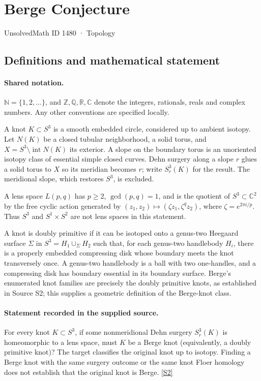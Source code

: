 \documentclass[11pt]{article}
\newcommand{\sref}[2]{\hyperlink{source:#1:#2}{[S#2]}}
\begin{document}
\setcounter{section}{1479}
\section{Berge Conjecture}\label{1480}
{\small\sffamily UnsolvedMath ID 1480 · Topology}
\subsection{Definitions and mathematical statement}

\paragraph{Shared notation.}$\mathbb N=\{1,2,\ldots\}$, and $\mathbb Z,\mathbb Q,\mathbb R,\mathbb C$ denote the integers, rationals, reals and complex numbers. Any other conventions are specified locally.


A knot $K\subset S^3$ is a smooth embedded circle, considered up to ambient isotopy. Let $N(K)$ be a closed tubular neighborhood, a solid torus, and $X=S^3\setminus\operatorname{int}N(K)$ its exterior. A slope on the boundary torus is an unoriented isotopy class of essential simple closed curves. Dehn surgery along a slope $r$ glues a solid torus to $X$ so its meridian becomes $r$; write $S^3_r(K)$ for the result. The meridional slope, which restores $S^3$, is excluded.

A lens space $L(p,q)$ has $p\ge2$, $\gcd(p,q)=1$, and is the quotient of $S^3\subset\mathbb C^2$ by the free cyclic action generated by $(z_1,z_2)\mapsto(\zeta z_1,\zeta^q z_2)$, where $\zeta=e^{2\pi i/p}$. Thus $S^3$ and $S^1\times S^2$ are not lens spaces in this statement.

A knot is doubly primitive if it can be isotoped onto a genus-two Heegaard surface $\Sigma$ in $S^3=H_1\cup_\Sigma H_2$ such that, for each genus-two handlebody $H_i$, there is a properly embedded compressing disk whose boundary meets the knot transversely once. A genus-two handlebody is a ball with two one-handles, and a compressing disk has boundary essential in its boundary surface. Berge's enumerated knot families are precisely the doubly primitive knots, as established in Source S2; this supplies a geometric definition of the Berge-knot class.
\paragraph{Statement recorded in the supplied source.}
For every knot $K\subset S^3$, if some nonmeridional Dehn surgery $S^3_r(K)$ is homeomorphic to a lens space, must $K$ be a Berge knot (equivalently, a doubly primitive knot)? The target classifies the original knot up to isotopy. Finding a Berge knot with the same surgery outcome or the same knot Floer homology does not establish that the original knot is Berge. \sref{1480}{2}
\end{document}
